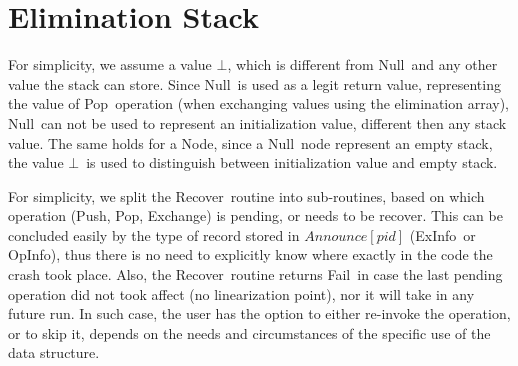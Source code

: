 
\newcommand{\push}{\mbox{\sc Push}}
\newcommand{\trypush}{\mbox{\sc TryPush}}
\newcommand{\recoverPush}{\mbox{\sc Push-Roceover}}
\newcommand{\pop}{\mbox{\sc Pop}}
\newcommand{\trypop}{\mbox{\sc TryPop}}
\newcommand{\recoverPop}{\mbox{\sc Pop-Recover}}
\newcommand{\recover}{\mbox{\sc Recover}}
\newcommand{\exchange}{\mbox{\sc Exchange}}
\newcommand{\recoverExchange}{\mbox{\sc Exchange-Recover}}
\newcommand{\visit}{\mbox{\sc Visit}}
\newcommand{\switchPair}{\mbox{\sc SwitchPair}}
\newcommand{\search}{\mbox{\sc Search}}


\newcommand{\init}{\mbox{$\bot$}}
\newcommand{\NULL}{\mbox{\sc Null}}
\newcommand{\fail}{\mbox{\sc Fail}}
\newcommand{\emptyst}{\mbox{\sc Empty}}
\newcommand{\waiting}{\mbox{\sc Waiting}}
\newcommand{\busy}{\mbox{\sc Busy}}
\newcommand{\timeout}{\mbox{\sc Timeout}}

\newcommand{\Info}{\mbox{Info}}
\newcommand{\opInfo}{\mbox{OpInfo}}
\newcommand{\pushInfo}{\mbox{PushInfo}}
\newcommand{\popInfo}{\mbox{PopInfo}}
\newcommand{\exInfo}{\mbox{ExInfo}}


\newcommand{\comnospace}{\mbox{$\triangleright$}}
\newcommand{\com}{\mbox{\comnospace\ }}
\newcommand{\tabtabcom}{\>\>\com}
\newcommand{\tabcom}{\>\com}


\section{Elimination Stack}

For simplicity, we assume a value \init, which is different from \NULL\ and any other value the stack can store. Since \NULL\ is used as a legit return value, representing the value of \pop\ operation (when exchanging values using the elimination array), \NULL\ can not be used to represent an initialization value, different then any stack value. The same holds for a Node, since a \NULL\ node represent an empty stack, the value \init\ is used to distinguish between initialization value and empty stack.

For simplicity, we split the \recover\ routine into sub-routines, based on which operation (\push, \pop, \exchange) is pending, or needs to be recover. This can be concluded easily by the type of record stored in $Announce[pid]$ (\exInfo\ or \opInfo), thus there is no need to explicitly know where exactly in the code the crash took place. Also, the \recover\ routine returns \fail\ in case the last pending operation did not took affect (no linearization point), nor it will take in any future run. In such case, the user has the option to either re-invoke the operation, or to skip it, depends on the needs and circumstances of the specific use of the data structure.

